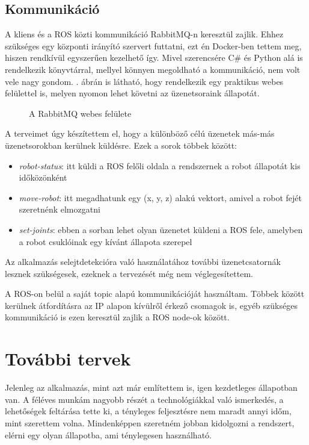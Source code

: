 \documentclass[11pt,a4paper,oneside]{article}
\newcommand{\Afigref}[1]{\Aref{fig:#1}.}
\newcommand{\insertfig}[4]{
	\vspace*{2mm}
	\begin{figure}[#4]
		\center
		\resizebox{#3}{!}{\texttt{[image: images/\#1]}}
		\parbox{0.8\textwidth}{\vspace*{4mm}\caption{{#2}}\small\label{fig:#1}}
	\end{figure}
	\vspace*{-2\parskip}
}
\begin{document}
\subsection{Kommunikáció}

A kliens és a ROS közti kommunikáció RabbitMQ-n keresztül zajlik. Ehhez szükséges egy központi irányító szervert futtatni, ezt én Docker-ben tettem meg, hiszen rendkívül egyszerűen kezelhető így. Mivel szerencsére C\# és Python alá is rendelkezik könyvtárral, mellyel könnyen megoldható a kommunikáció, nem volt vele nagy gondom. \Afigref{rabbit_queue} ábrán is látható, hogy rendelkezik egy praktikus webes felülettel is, melyen nyomon lehet követni az üzenetsoraink állapotát.

\insertfig{rabbit_queue}{A RabbitMQ webes felülete}{14cm}{h!}

A terveimet úgy készítettem el, hogy a különböző célú üzenetek más-más üzenetsorokban kerülnek küldésre. Ezek a sorok többek között:
\begin{itemize}
  \item \emph{robot-status}: itt küldi a ROS felőli oldala a rendszernek a robot állapotát kis időközönként
  \item \emph{move-robot}: itt megadhatunk egy (x, y, z) alakú vektort, amivel a robot fejét szeretnénk elmozgatni
  \item \emph{set-joints}: ebben a sorban lehet olyan üzenetet küldeni a ROS fele, amelyben a robot csuklóinak egy kívánt állapota szerepel
\end{itemize}

Az alkalmazás selejtdetekcióra való használatához további üzenetcsatornák lesznek szükségesek, ezeknek a tervezését még nem véglegesítettem.

A ROS-on belül a saját topic alapú kommunikációját használtam. Többek között kerülnek átfordításra az IP alapon kívülről érkező csomagok is, egyéb szükséges kommunikáció is ezen keresztül zajlik a ROS node-ok között.

\section{További tervek}

Jelenleg az alkalmazás, mint azt már említettem is, igen kezdetleges állapotban van. A féléves munkám nagyobb részét a technológiákkal való ismerkedés, a lehetőségek feltárása tette ki, a tényleges feljesztésre nem maradt annyi időm, mint szerettem volna. Mindenképpen szeretném jobban kidolgozni a rendszert, elérni egy olyan állapotba, ami ténylegesen használható.
\end{document}
